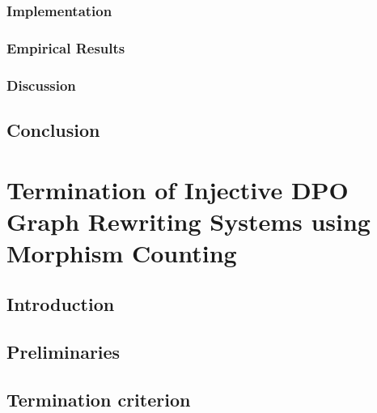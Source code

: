 \documentclass{report}
\begin{document}
 

\subsection{Implementation}
\label{nwf:sec:type_graph:implementation}
 

\subsection{Empirical Results}
\label{nwf:sec:type_graph:result}
 

\subsection{Discussion}
\label{nwf:sec:type_graph:related_work}


\section{Conclusion}
\label{nwf:sec:type_graph:conclusion}


\chapter{Termination of Injective DPO Graph Rewriting
Systems using Morphism Counting}
\label{chap:subgraph_counting}

\section{Introduction}
\label{subgraph_counting:sec:intro}


\section{Preliminaries} 
\label{subgraph_counting:sec:pre} 


 
  
\section{Termination criterion}
\label{subgraph_counting:sec:termination} 

 
\end{document}

